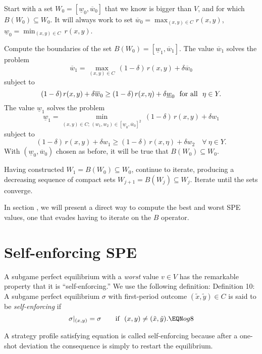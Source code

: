   Start with a set $W_0 = [\underline{w}_0,\overline w_0]$ that
we know is bigger than $V$, and for which
$B(W_0) \subseteq W_0$.  It will always work to set $\overline w_0 =
\max_{(x,y)\in C}
 r(x,y)$, $\underline{w}_0=\min_{(x,y)\in C} \, r(x,y)$.
\medskip

  Compute the boundaries of the set $B(W_0) = [\underline{w}_1,
\overline w_1]$.  The value $\overline w_1$ solves the problem
$$\overline w_1 = \max_{(x,y)\in C}\, (1-\delta)\, r(x,y) + \delta
\overline w_0$$
subject to
$$(1-\delta)\, r(x,y) + \delta \overline w_0\geq (1-\delta)\, r(x,\eta) +
\delta \underline{w}_0\ \hbox{ for all }\ \eta \in Y.$$
The value $\underline{w}_1$ solves the problem
$$\underline{w}_1 = \min_{(x,y)\in C;\, (w_1,w_2)\in
[\underline{w}_0,\overline w_0]^2}\
(1-\delta)\, r(x,y) + \delta w_1$$
subject to
$$(1-\delta)\, r(x,y) + \delta w_1 \geq (1-\delta)\, r(x,\eta) + \delta
w_2\quad\forall\ \eta\in Y.$$
With $(\underline w_0, \overline w_0)$ chosen as before, it will be
true that $B(W_0) \subseteq W_0$.
\medskip

  Having constructed $W_1 = B (W_0) \subseteq W_0$, continue to
iterate, producing a decreasing sequence of compact sets $W_{j+1} = B (W_j)
\subseteq W_j$.  Iterate until the sets converge.


\medskip
In section , we will present a direct way to compute the best and worst
SPE values, one that evades  having to iterate  on
the $B$ operator.
\section{Self-enforcing SPE}
A subgame perfect equilibrium with a {\it worst\/} value
$v\in V$ has  the remarkable property that it is ``self-enforcing.''
We use the following definition:
\medskip\noindent
{\sc Definition 10:}  A subgame perfect equilibrium $\sigma$ with
first-period outcome $(\tilde x,\tilde y)\in C$ is said to be
{\it self-enforcing\/} if
$$\sigma\vert_{(x,y)} = \sigma\qquad \hbox{if }\ (x,y) \not=(\tilde x,\tilde
y) .\EQN og8$$

\noindent
A strategy profile satisfying equation  is called self-enforcing
because after a one-shot deviation the consequence is
simply to restart the equilibrium.
\medskip

